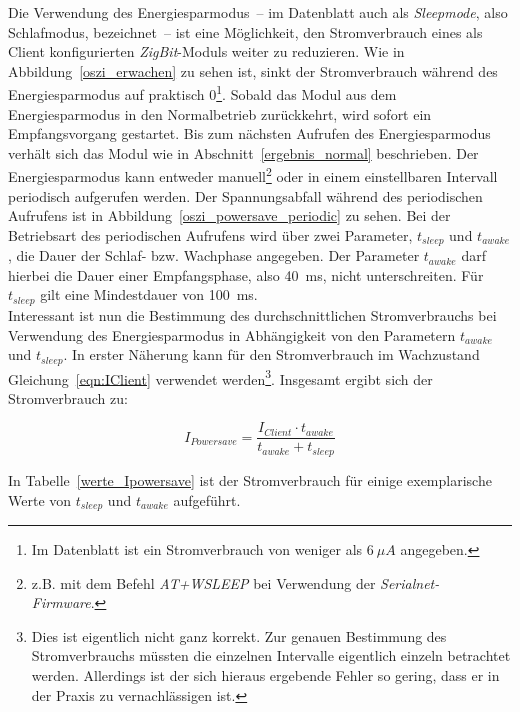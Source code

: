Die Verwendung des Energiesparmodus~-- im Datenblatt auch als \emph{Sleepmode}, also Schlafmodus, bezeichnet~-- ist eine
Möglichkeit, den Stromverbrauch eines als Client konfigurierten \emph{ZigBit}-Moduls weiter zu reduzieren. Wie in 
Abbildung~\ref{oszi_erwachen} zu sehen ist, sinkt der Stromverbrauch während des Energiesparmodus auf praktisch 
0\footnote{Im Datenblatt ist ein Stromverbrauch von weniger als $6~\mu{}A$ angegeben.}. Sobald das Modul aus dem 
Energiesparmodus in den Normalbetrieb zurückkehrt, wird sofort ein Empfangsvorgang gestartet. Bis zum nächsten Aufrufen des 
Energiesparmodus verhält sich das Modul wie in Abschnitt~\ref{ergebnis_normal} beschrieben. Der Energiesparmodus kann
entweder manuell\footnote{z.B. mit dem Befehl \emph{AT+WSLEEP} bei Verwendung der \emph{Serialnet-Firmware}.} oder in einem 
einstellbaren Intervall periodisch aufgerufen werden. Der Spannungsabfall während des periodischen Aufrufens ist in
Abbildung~\ref{oszi_powersave_periodic} zu sehen. Bei der Betriebsart des periodischen Aufrufens wird über zwei Parameter,
$t_{sleep}$ und $t_{awake}$, die Dauer der Schlaf- bzw. Wachphase angegeben. Der Parameter $t_{awake}$ darf hierbei die Dauer
einer Empfangsphase, also 40~ms, nicht unterschreiten. Für $t_{sleep}$ gilt eine Mindestdauer von 100~ms.\\
Interessant ist nun die Bestimmung des durchschnittlichen Stromverbrauchs bei Verwendung des Energiesparmodus
in Abhängigkeit von den Parametern $t_{awake}$ und $t_{sleep}$. In erster Näherung kann für den Stromverbrauch im Wachzustand
Gleichung~\ref{eqn:IClient} verwendet werden\footnote{Dies ist eigentlich nicht ganz korrekt.
Zur genauen Bestimmung des Stromverbrauchs müssten die einzelnen Intervalle 
eigentlich einzeln betrachtet werden. Allerdings ist der sich hieraus ergebende Fehler so gering, dass er in der Praxis zu 
vernachlässigen ist.}. Insgesamt ergibt sich der Stromverbrauch zu:

\begin{equation}
   I_{Powersave} = \frac{I_{Client} \cdot t_{awake}}{t_{awake} + t_{sleep}}
\end{equation}

In Tabelle~\ref{werte_Ipowersave} ist der Stromverbrauch für einige exemplarische Werte von $t_{sleep}$ und $t_{awake}$ 
aufgeführt.

